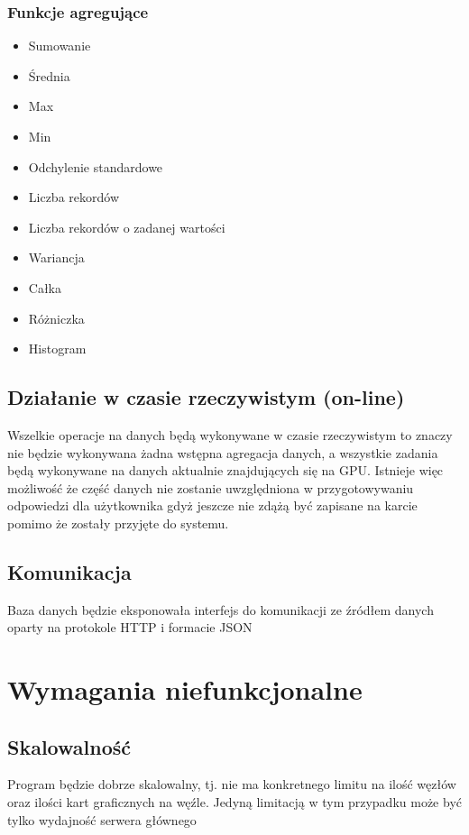 \documentclass[paper=a4, fontsize=11pt]{scrartcl} %
\numberwithin{equation}{section} %
\numberwithin{figure}{section} %
\numberwithin{table}{section} %
\begin{document}
        \subsubsection{Funkcje agregujące}
        \begin{itemize}
            \item Sumowanie
            \item Średnia
            \item Max
            \item Min
            \item Odchylenie standardowe
            \item Liczba rekordów
            \item Liczba rekordów o zadanej wartości
            \item Wariancja
            \item Całka
            \item Różniczka
            \item Histogram
        \end{itemize}
    \subsection{Działanie w czasie rzeczywistym (on-line)}
    Wszelkie operacje na danych będą wykonywane w czasie rzeczywistym to znaczy nie będzie wykonywana żadna wstępna agregacja
    danych, a wszystkie zadania będą wykonywane na danych aktualnie znajdujących się na GPU. Istnieje więc możliwość że
    część danych nie zostanie uwzględniona w przygotowywaniu odpowiedzi dla użytkownika gdyż jeszcze nie zdążą być zapisane na
    karcie pomimo że zostały przyjęte do systemu.
    \subsection{Komunikacja}
    Baza danych będzie eksponowała interfejs do komunikacji ze źródłem danych oparty na protokole HTTP i formacie JSON
\section{Wymagania niefunkcjonalne}
    \subsection{Skalowalność}
    Program będzie dobrze skalowalny, tj. nie ma konkretnego limitu na ilość węzłów oraz ilości kart graficznych na węźle.
     Jedyną limitacją w tym przypadku może być tylko wydajność serwera głównego
\end{document}
